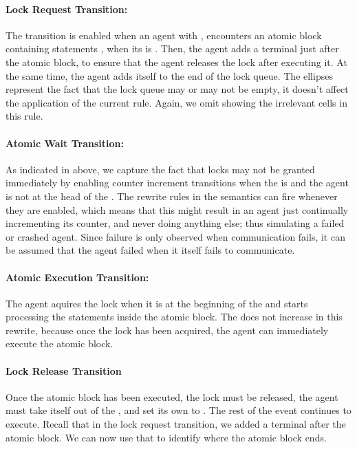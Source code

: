 \paragraph{Lock Request Transition:} The  transition is enabled when an agent with  , encounters an atomic block containing statements , when its  is . Then, the agent adds a terminal  just after the atomic block, to ensure that the agent releases the lock after executing it. At the same time, the agent adds itself to the end of the lock queue. The ellipses represent the fact that the lock queue may or may not be empty, it doesn't affect the application of the current rule. Again, we omit showing the irrelevant cells in this rule. 

\paragraph{Atomic Wait Transition:} As indicated in above, we capture the fact that locks may not be granted immediately by enabling counter increment transitions when the  is  and the agent  is not at the head of the . The rewrite rules in the semantics can fire whenever they are enabled, which means that this might result in an agent just continually incrementing its counter, and never doing anything else; thus simulating a failed or crashed agent. Since failure is only observed when communication fails, it can be assumed that the agent failed when it itself fails to communicate. 

\paragraph{Atomic Execution Transition:} The agent aquires the lock when it is at the beginning of the  and starts processing the statements inside the atomic block. The  does not increase in this rewrite, because once the lock has been acquired, the agent can immediately execute the atomic block. 

\paragraph{Lock Release Transition}
Once the atomic block has been executed, the lock must be released, the agent must take itself out of the , and set its own  to . The rest of the event continues to execute. Recall that in the lock request transition, we added a terminal  after the atomic block. We can now use that to identify where the atomic block ends. 

%